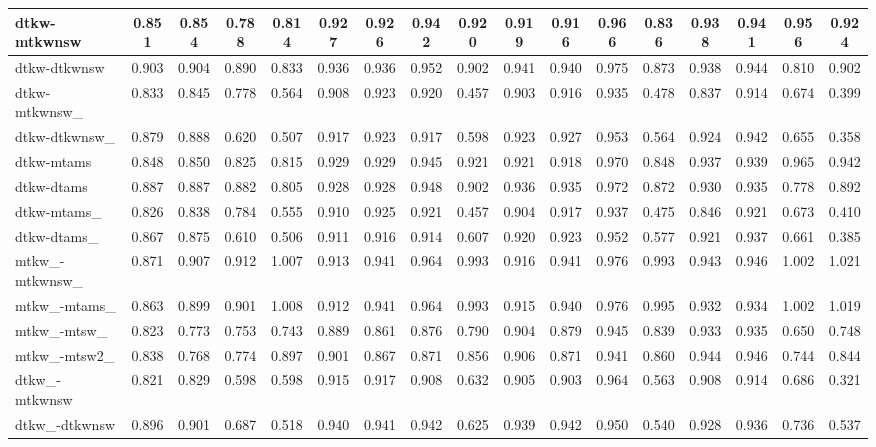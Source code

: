 \documentclass[%
 aip,
 jmp,%
 amsmath,amssymb,
 reprint,%
]{revtex4-1}
\begin{document}
\begin{longtable*}{|p{2cm}||c|c|c|c|| c|c|c|c|| c|c|c|c|| c|c|c|c|}
dtkw-mtkwnsw & 0.851 & 0.854 & 0.788 & 0.814 & 0.927 & 0.926 & 0.942 & 0.920 & 0.919 & 0.916 & 0.966 & 0.836 & 0.938 & 0.941 & 0.956 & 0.924 \\ \hline
dtkw-dtkwnsw & 0.903 & 0.904 & 0.890 & 0.833 & 0.936 & 0.936 & 0.952 & 0.902 & 0.941 & 0.940 & 0.975 & 0.873 & 0.938 & 0.944 & 0.810 & 0.902 \\ \hline
dtkw-mtkwnsw\_ & 0.833 & 0.845 & 0.778 & 0.564 & 0.908 & 0.923 & 0.920 & 0.457 & 0.903 & 0.916 & 0.935 & 0.478 & 0.837 & 0.914 & 0.674 & 0.399 \\ \hline
dtkw-dtkwnsw\_ & 0.879 & 0.888 & 0.620 & 0.507 & 0.917 & 0.923 & 0.917 & 0.598 & 0.923 & 0.927 & 0.953 & 0.564 & 0.924 & 0.942 & 0.655 & 0.358 \\ \hline
dtkw-mtams & 0.848 & 0.850 & 0.825 & 0.815 & 0.929 & 0.929 & 0.945 & 0.921 & 0.921 & 0.918 & 0.970 & 0.848 & 0.937 & 0.939 & 0.965 & 0.942 \\ \hline
dtkw-dtams & 0.887 & 0.887 & 0.882 & 0.805 & 0.928 & 0.928 & 0.948 & 0.902 & 0.936 & 0.935 & 0.972 & 0.872 & 0.930 & 0.935 & 0.778 & 0.892 \\ \hline
dtkw-mtams\_ & 0.826 & 0.838 & 0.784 & 0.555 & 0.910 & 0.925 & 0.921 & 0.457 & 0.904 & 0.917 & 0.937 & 0.475 & 0.846 & 0.921 & 0.673 & 0.410 \\ \hline
dtkw-dtams\_ & 0.867 & 0.875 & 0.610 & 0.506 & 0.911 & 0.916 & 0.914 & 0.607 & 0.920 & 0.923 & 0.952 & 0.577 & 0.921 & 0.937 & 0.661 & 0.385 \\ \hline
mtkw\_-mtkwnsw\_ & 0.871 & 0.907 & 0.912 & 1.007 & 0.913 & 0.941 & 0.964 & 0.993 & 0.916 & 0.941 & 0.976 & 0.993 & 0.943 & 0.946 & 1.002 & 1.021 \\ \hline
mtkw\_-mtams\_ & 0.863 & 0.899 & 0.901 & 1.008 & 0.912 & 0.941 & 0.964 & 0.993 & 0.915 & 0.940 & 0.976 & 0.995 & 0.932 & 0.934 & 1.002 & 1.019 \\ \hline
mtkw\_-mtsw\_ & 0.823 & 0.773 & 0.753 & 0.743 & 0.889 & 0.861 & 0.876 & 0.790 & 0.904 & 0.879 & 0.945 & 0.839 & 0.933 & 0.935 & 0.650 & 0.748 \\ \hline
mtkw\_-mtsw2\_ & 0.838 & 0.768 & 0.774 & 0.897 & 0.901 & 0.867 & 0.871 & 0.856 & 0.906 & 0.871 & 0.941 & 0.860 & 0.944 & 0.946 & 0.744 & 0.844 \\ \hline
dtkw\_-mtkwnsw & 0.821 & 0.829 & 0.598 & 0.598 & 0.915 & 0.917 & 0.908 & 0.632 & 0.905 & 0.903 & 0.964 & 0.563 & 0.908 & 0.914 & 0.686 & 0.321 \\ \hline
dtkw\_-dtkwnsw & 0.896 & 0.901 & 0.687 & 0.518 & 0.940 & 0.941 & 0.942 & 0.625 & 0.939 & 0.942 & 0.950 & 0.540 & 0.928 & 0.936 & 0.736 & 0.537 \\ \hline

\end{longtable*}
\end{document}

